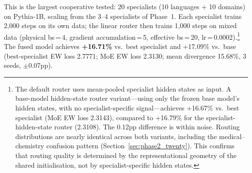 \documentclass{article}
\begin{document}
This is the largest cooperative tested: 20 specialists (10 languages + 10 domains) on Pythia-1B, scaling from the 3--4 specialists of Phase~1. Each specialist trains 2,000 steps on its own data; the linear router then trains 1,000 steps on mixed data (physical bs\,=\,4, gradient accumulation\,=\,5, effective bs\,=\,20, lr\,=\,0.0002).\footnote{The default router uses mean-pooled specialist hidden states as input. A base-model hidden-state router variant---using only the frozen base model's hidden states, with no specialist-specific signal---achieves +16.67\% vs.\ best specialist (MoE EW loss 2.3143), compared to +16.79\% for the specialist-hidden-state router (2.3108). The 0.12pp difference is within noise. Routing distributions are nearly identical across both variants, including the medical--chemistry confusion pattern (Section~\ref{sec:phase2_twenty}). This confirms that routing quality is determined by the representational geometry of the shared initialisation, not by specialist-specific hidden states.} The fused model achieves \textbf{+16.71\%} vs.\ best specialist and +17.09\% vs.\ base (best-specialist EW loss 2.7771; MoE EW loss 2.3130; mean divergence 15.68\%, 3 seeds, $\pm$0.07pp).
\end{document}
